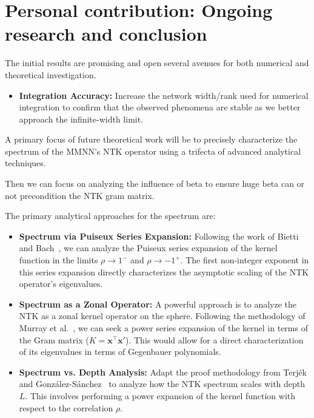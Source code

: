\documentclass[a4paper]{article}
\theoremstyle{plain}
\theoremstyle{definition}
\theoremstyle{remark}
\begin{document}
\newpage
\section{Personal contribution: Ongoing research and conclusion}

The initial results are promising and open several avenues for both numerical and theoretical investigation.

\begin{tcolorbox}[colback=red!5,colframe=red!80!black,title={\textbf{Numerical Investigations}},enhanced,drop shadow,boxrule=2pt]
\begin{itemize}
    \item \textbf{Integration Accuracy:} Increase the network width/rank used for numerical integration to confirm that the observed phenomena are stable as we better approach the infinite-width limit.
\end{itemize}
\end{tcolorbox}

\begin{tcolorbox}[colback=red!5,colframe=red!80!black,title={\textbf{Mathematical Investigations: Spectrum Analysis}},enhanced,drop shadow,boxrule=2pt]
A primary focus of future theoretical work will be to precisely characterize the spectrum of the MMNN's NTK operator using a trifecta of advanced analytical techniques.

Then we can focus on analyzing the influence of beta to ensure huge beta can or not precondition the NTK gram matrix.

The primary analytical approaches for the spectrum are:
\begin{itemize}
    \item \textbf{Spectrum via Puiseux Series Expansion:} Following the work of Bietti and Bach~\cite{bietti2021deepequalsshallowrelu}, we can analyze the Puiseux series expansion of the kernel function in the limits $\rho \to 1^-$ and $\rho \to -1^+$. The first non-integer exponent in this series expansion directly characterizes the asymptotic scaling of the NTK operator's eigenvalues.
    \item \textbf{Spectrum as a Zonal Operator:} A powerful approach is to analyze the NTK as a zonal kernel operator on the sphere. Following the methodology of Murray et al.~\cite{murray2023characterizingspectrumntkpower}, we can seek a power series expansion of the kernel in terms of the Gram matrix ($K = \bm{x}^\top\bm{x}'$). This would allow for a direct characterization of its eigenvalues in terms of Gegenbauer polynomials.
    \item \textbf{Spectrum vs. Depth Analysis:} Adapt the proof methodology from Terj\'{e}k and Gonz\'{a}lez-S\'{a}nchez~\cite{terjek2025mlpseocspectrumntk} to analyze how the NTK spectrum scales with depth $L$. This involves performing a power expansion of the kernel function with respect to the correlation $\rho$.
\end{itemize}
\end{tcolorbox}
\end{document}
